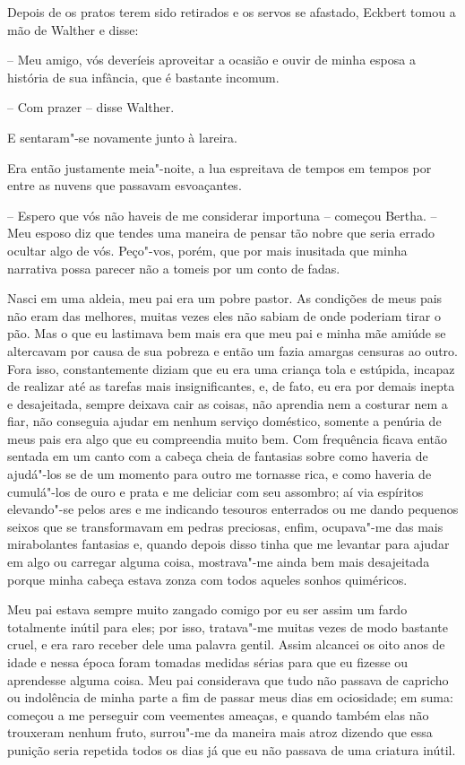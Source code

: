 Depois de os pratos terem sido retirados e os servos se afastado,
Eckbert tomou a mão de Walther e disse:

-- Meu amigo, vós deveríeis aproveitar a ocasião e ouvir de minha
esposa a história de sua infância, que é bastante incomum.

-- Com prazer -- disse Walther.

E sentaram"-se novamente junto à lareira.

Era então justamente meia"-noite, a lua espreitava de tempos em tempos
por entre as nuvens que passavam esvoaçantes.

-- Espero que vós não haveis de me considerar importuna -- começou
Bertha. -- Meu esposo diz que tendes uma maneira de pensar tão nobre que
seria errado ocultar algo de vós. Peço"-vos, porém, que por mais
inusitada que minha narrativa possa parecer não a tomeis por um conto
de fadas.

Nasci em uma aldeia, meu pai era um pobre pastor. As condições de meus
pais não eram das melhores, muitas vezes eles não sabiam de onde
poderiam tirar o pão. Mas o que eu lastimava bem mais era que meu pai e
minha mãe amiúde se altercavam por causa de sua pobreza e então um
fazia amargas censuras ao outro. Fora isso, constantemente diziam que
eu era uma criança tola e estúpida, incapaz de realizar até as tarefas
mais insignificantes, e, de fato, eu era por demais inepta e
desajeitada, sempre deixava cair as coisas, não aprendia nem a costurar
nem a fiar, não conseguia ajudar em nenhum serviço doméstico, somente a
penúria de meus pais era algo que eu compreendia muito bem. Com frequência
ficava então sentada em um canto com a cabeça cheia de fantasias sobre
como haveria de ajudá"-los se de um momento para outro me tornasse rica,
e como haveria de cumulá"-los de ouro e prata e me \mbox{deliciar} com seu
assombro; aí via espíritos elevando"-se pelos ares e me indicando
tesouros enterrados ou me dando pequenos seixos que se transformavam em
pedras preciosas, enfim, ocupava"-me das mais mirabolantes fantasias e,
quando depois disso tinha que me levantar para ajudar em algo ou
carregar alguma coisa, mostrava"-me ainda bem mais desajeitada porque
minha cabeça estava zonza com todos aqueles sonhos quiméricos.

Meu pai estava sempre muito zangado comigo por eu ser assim um fardo
totalmente inútil para eles; por isso, tratava"-me muitas vezes de modo
bastante cruel, e era raro receber dele uma palavra gentil. Assim
alcancei os oito anos de idade e nessa época foram
tomadas medidas sérias para que eu fizesse ou aprendesse alguma coisa.
Meu pai considerava que tudo não passava de capricho ou indolência de
minha parte a fim de passar meus dias em ociosidade; em suma: 
começou a me perseguir com veementes ameaças, e quando também elas não
trouxeram nenhum fruto, surrou"-me da maneira mais atroz dizendo que
essa punição seria repetida todos os dias já que eu não passava de uma
criatura inútil.

